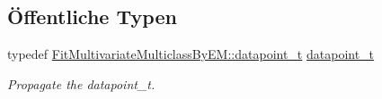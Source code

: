 \subsection*{Öffentliche Typen}
\begin{DoxyCompactItemize}
\item 
\hypertarget{classCDA_1_1EMGenericMixtureModelCore_a59c8aa9101530e99b1392d848fd50357}{
typedef \hyperlink{classCDA_1_1FitMultivariateMulticlassByEM_a1da490e479036c62f0cbf55dd06201a6}{FitMultivariateMulticlassByEM::datapoint\_\-t} \hyperlink{classCDA_1_1EMGenericMixtureModelCore_a59c8aa9101530e99b1392d848fd50357}{datapoint\_\-t}}
\label{classCDA_1_1EMGenericMixtureModelCore_a59c8aa9101530e99b1392d848fd50357}

\begin{DoxyCompactList}\small\item\em Propagate the datapoint\_\-t. \item\end{DoxyCompactList}\end{DoxyCompactItemize}
